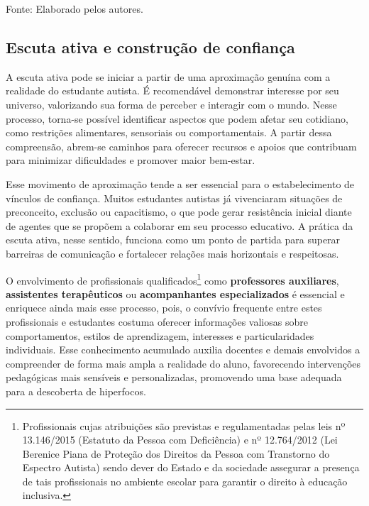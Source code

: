 \documentclass[
  12pt,
  a4paper,
]{article}
\newenvironment{Fonte}
  {\par\begin{center}\begingroup\setstretch{1}\small}
  {\par\endgroup\end{center}}
\begin{document}
\begin{Fonte}

Fonte: Elaborado pelos autores.

\end{Fonte}

\hypertarget{subsec:escuta}{%
\subsection{Escuta ativa e construção de
confiança}\label{subsec:escuta}}

A escuta ativa pode se iniciar a partir de uma aproximação genuína com a
realidade do estudante autista. É recomendável demonstrar interesse por
seu universo, valorizando sua forma de perceber e interagir com o mundo.
Nesse processo, torna-se possível identificar aspectos que podem afetar
seu cotidiano, como restrições alimentares, sensoriais ou
comportamentais. A partir dessa compreensão, abrem-se caminhos para
oferecer recursos e apoios que contribuam para minimizar dificuldades e
promover maior bem-estar.

Esse movimento de aproximação tende a ser essencial para o
estabelecimento de vínculos de confiança. Muitos estudantes autistas já
vivenciaram situações de preconceito, exclusão ou capacitismo, o que
pode gerar resistência inicial diante de agentes que se propõem a
colaborar em seu processo educativo. A prática da escuta ativa, nesse
sentido, funciona como um ponto de partida para superar barreiras de
comunicação e fortalecer relações mais horizontais e respeitosas.

O envolvimento de profissionais qualificados\footnote{Profissionais
  cujas atribuições são previstas e regulamentadas pelas leis nº
  13.146/2015 (Estatuto da Pessoa com Deficiência) e nº 12.764/2012 (Lei
  Berenice Piana de Proteção dos Direitos da Pessoa com Transtorno do
  Espectro Autista) sendo dever do Estado e da sociedade assegurar a
  presença de tais profissionais no ambiente escolar para garantir o
  direito à educação inclusiva.} como \textbf{professores auxiliares},
\textbf{assistentes terapêuticos} ou \textbf{acompanhantes
especializados} é essencial e enriquece ainda mais esse processo, pois,
o convívio frequente entre estes profissionais e estudantes costuma
oferecer informações valiosas sobre comportamentos, estilos de
aprendizagem, interesses e particularidades individuais. Esse
conhecimento acumulado auxilia docentes e demais envolvidos a
compreender de forma mais ampla a realidade do aluno, favorecendo
intervenções pedagógicas mais sensíveis e personalizadas, promovendo uma
base adequada para a descoberta de hiperfocos.
\end{document}
